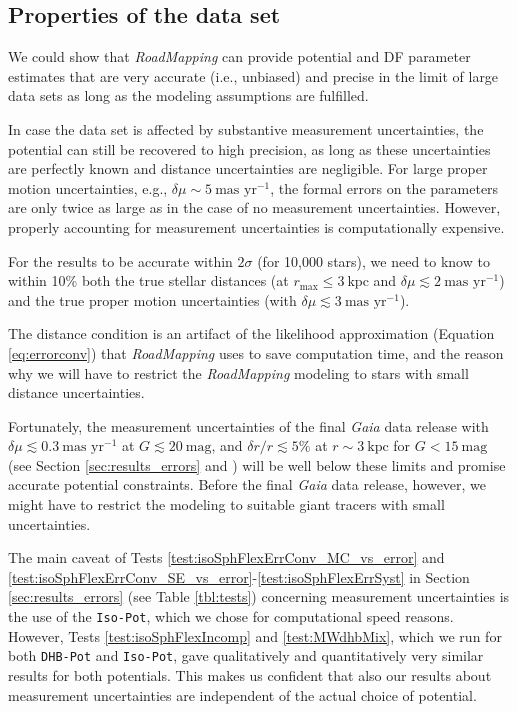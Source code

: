 \documentclass[iop,revtex4,numberedappendix,appendixfloats]{emulateapj}
\newcommand{\RM}{{\sl RoadMapping}}
\begin{document}
\subsection{Properties of the data set} 

We could show that \RM{} can provide potential and DF parameter estimates that are very accurate (i.e., unbiased) and precise in the limit of large data sets as long as the modeling assumptions are fulfilled.

In case the data set is affected by substantive measurement uncertainties, the potential can still be recovered to high precision, as long as these uncertainties are perfectly known and distance uncertainties are negligible. For large proper motion uncertainties, e.g., $\delta \mu \sim 5~\text{mas yr}^{-1}$, the formal errors on the parameters are only twice as large as in the case of no measurement uncertainties. However, properly accounting for measurement uncertainties is computationally expensive.

For the results to be accurate within $2\sigma$ (for 10,000 stars), we need to know to within 10\% both the true stellar distances (at $r_\text{max} \leq 3~\text{kpc}$ and $\delta \mu \lesssim 2 ~ \text{mas yr}^{-1}$) and the true proper motion uncertainties (with $\delta \mu \lesssim 3 ~ \text{mas yr}^{-1}$).

The distance condition is an artifact of the likelihood approximation (Equation \eqref{eq:errorconv}) that \RM{} uses to save computation time, and the reason why we will have to restrict the \RM{} modeling to stars with small distance uncertainties.

Fortunately, the measurement uncertainties of the final \emph{Gaia} data release with $\delta\mu\lesssim0.3~\text{mas yr}^{-1}$ at $G\lesssim20~\text{mag}$, and $\delta r/r\lesssim5\%$ at $r\sim3~\text{kpc}$ for $G<15~\text{mag}$ (see Section \ref{sec:results_errors} and \citealt{2014EAS....67...23D}) will be well below these limits and promise accurate potential constraints. Before the final \emph{Gaia} data release, however, we might have to restrict the modeling to suitable giant tracers with small uncertainties.

The main caveat of Tests \ref{test:isoSphFlexErrConv_MC_vs_error} and \ref{test:isoSphFlexErrConv_SE_vs_error}-\ref{test:isoSphFlexErrSyst} in Section \ref{sec:results_errors} (see Table \ref{tbl:tests}) concerning measurement uncertainties is the use of the \texttt{Iso-Pot}, which we chose for computational speed reasons. However, Tests \ref{test:isoSphFlexIncomp} and \ref{test:MWdhbMix}, which we run for both \texttt{DHB-Pot} and \texttt{Iso-Pot}, gave qualitatively and quantitatively very similar results for both potentials. This makes us confident that also our results about measurement uncertainties are independent of the actual choice of potential.
\end{document}
